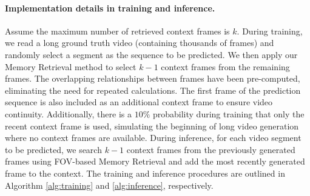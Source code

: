 \paragraph{Implementation details in training and inference.} Assume the maximum number of retrieved context frames is $k$. 
During training, we read a long ground truth video (containing thousands of frames) and randomly select a segment as the sequence to be predicted. We then apply our Memory Retrieval method to select $k-1$ context frames from the remaining frames. The overlapping relationships between frames have been pre-computed, eliminating the need for repeated calculations. The first frame of the prediction sequence is also included as an additional context frame to ensure video continuity. Additionally, there is a $10\%$ probability during training that only the recent context frame is used, simulating the beginning of long video generation where no context frames are available. 
During inference, for each video segment to be predicted, we search $k-1$ context frames from the previously generated frames using FOV-based Memory Retrieval and add the most recently generated frame to the context.
The training and inference procedures are outlined in Algorithm \ref{alg:training} and \ref{alg:inference}, respectively.


